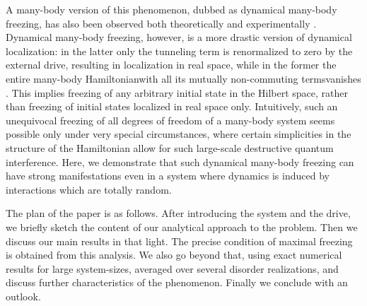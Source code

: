 \documentclass[reprint,preprintnumbers,showpacs,amsmath,twocolumn,showkeys,aps,prl]{revtex4-1}
\begin{document}
A many-body version of this phenomenon, dubbed as dynamical many-body 
freezing, has also been observed both theoretically 
\cite{AD-DQH,SB-AD-SDG,AD-RM,Russomanno,Anatoli-Periodic,Sei-Book} 
and experimentally \cite{DMF-IISER-Exp}. Dynamical many-body freezing, however, is a 
more drastic version of dynamical localization: in the latter only the tunneling term is 
renormalized to zero by the external drive, resulting in 
localization in real space, while in the former the entire many-body Hamiltonian\textemdash with all its mutually
non-commuting terms\textemdash vanishes \cite{AD-DQH}. This implies 
freezing of any arbitrary initial state in the Hilbert space, rather than freezing of initial 
states localized in real space only. Intuitively, such an unequivocal freezing of all degrees of freedom 
of a many-body system seems possible only under very special circumstances, where certain simplicities in the structure of the Hamiltonian allow for such large-scale destructive quantum interference. Here, we demonstrate that such dynamical 
many-body freezing can have strong manifestations even in a system where dynamics 
is induced by interactions which are totally random.

The plan of the paper is as follows. After introducing the system and the drive, we briefly
sketch the content of our analytical approach to the problem. Then we discuss our main 
results in that light. The precise condition of maximal freezing is obtained from this
analysis. We also go beyond that, using exact numerical results for large system-sizes, averaged
over several disorder realizations, and discuss further characteristics of the phenomenon. 
Finally we conclude with an outlook.
\noindent
\end{document}

